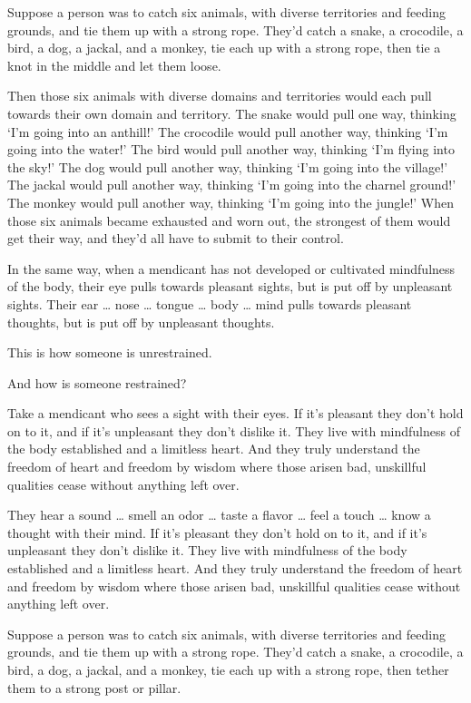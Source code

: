\documentclass[12pt,openany]{book}%
\begin{document}
Suppose a person was to catch six animals, with diverse territories and feeding grounds, and tie them up with a strong rope. They’d catch a snake, a crocodile, a bird, a dog, a jackal, and a monkey, tie each up with a strong rope, then tie a knot in the middle and let them loose. 

Then those six animals with diverse domains and territories would each pull towards their own domain and territory. The snake would pull one way, thinking ‘I’m going into an anthill!’ The crocodile would pull another way, thinking ‘I’m going into the water!’ The bird would pull another way, thinking ‘I’m flying into the sky!’ The dog would pull another way, thinking ‘I’m going into the village!’ The jackal would pull another way, thinking ‘I’m going into the charnel ground!’ The monkey would pull another way, thinking ‘I’m going into the jungle!’ When those six animals became exhausted and worn out, the strongest of them would get their way, and they’d all have to submit to their control. 

In the same way, when a mendicant has not developed or cultivated mindfulness of the body, their eye pulls towards pleasant sights, but is put off by unpleasant sights. Their ear … nose … tongue … body … mind pulls towards pleasant thoughts, but is put off by unpleasant thoughts. 

This is how someone is unrestrained. 

And how is someone restrained? 

Take a mendicant who sees a sight with their eyes. If it’s pleasant they don’t hold on to it, and if it’s unpleasant they don’t dislike it. They live with mindfulness of the body established and a limitless heart. And they truly understand the freedom of heart and freedom by wisdom where those arisen bad, unskillful qualities cease without anything left over. 

They hear a sound … smell an odor … taste a flavor … feel a touch … know a thought with their mind. If it’s pleasant they don’t hold on to it, and if it’s unpleasant they don’t dislike it. They live with mindfulness of the body established and a limitless heart. And they truly understand the freedom of heart and freedom by wisdom where those arisen bad, unskillful qualities cease without anything left over. 

Suppose a person was to catch six animals, with diverse territories and feeding grounds, and tie them up with a strong rope. They’d catch a snake, a crocodile, a bird, a dog, a jackal, and a monkey, tie each up with a strong rope, then tether them to a strong post or pillar. 
\end{document}

